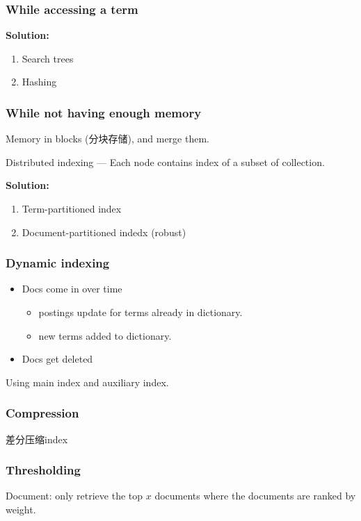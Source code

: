 \subsubsection{While accessing a term}
\textbf{Solution:}
\begin{enumerate}
    \item Search trees
    \item Hashing
\end{enumerate}

\subsubsection{While not having enough memory}
Memory in blocks (分块存储), and merge them. 

Distributed indexing --- Each node contains index of a subset of collection. 

\textbf{Solution:}
\begin{enumerate}
    \item Term-partitioned index
    \item Document-partitioned indedx (robust)
\end{enumerate}

\subsubsection{Dynamic indexing}

\begin{itemize}
    \item Docs come in over time
    \begin{itemize}
        \item postings update for terms already in dictionary. 
        \item new terms added to dictionary. 
    \end{itemize}
    \item Docs get deleted
\end{itemize}

Using main index and auxiliary index. 

\subsubsection{Compression}
差分压缩index

\subsubsection{Thresholding}
Document: only retrieve the top $x$ documents where the documents are ranked by weight. 

